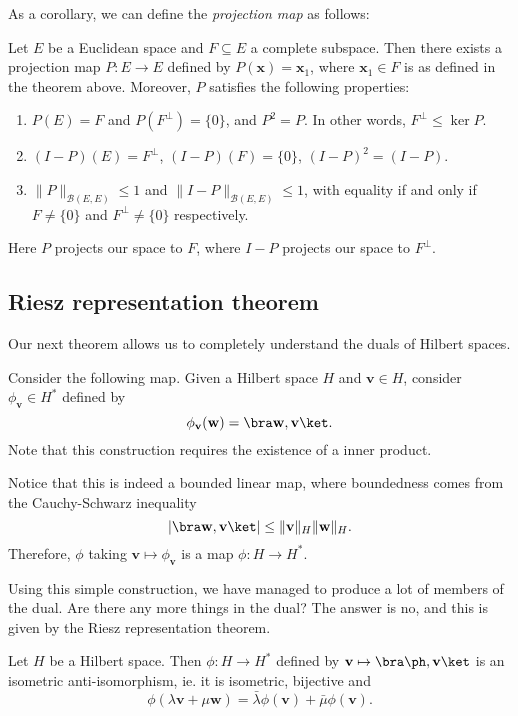 \documentclass[a4paper]{article}
\begin{document}
As a corollary, we can define the \emph{projection map} as follows:
\begin{cor}
  Let $E$ be a Euclidean space and $F\subseteq E$ a complete subspace. Then there exists a projection map $P: E \to E$ defined by $P(\mathbf{x}) = \mathbf{x}_1$, where $\mathbf{x}_1 \in F$ is as defined in the theorem above. Moreover, $P$ satisfies the following properties:
  \begin{enumerate}
    \item $P(E) = F$ and $P(F^\perp) = \{0\}$, and $P^2 = P$. In other words, $F^\perp \leq \ker P$.
    \item $(I - P)(E) = F^{\perp}$, $(I - P)(F) = \{0\}$, $(I - P)^2 = (I - P)$.
    \item $\|P\|_{\mathcal{B}(E, E)} \leq 1$ and $\|I - P\|_{\mathcal{B}(E, E)} \leq 1$, with equality if and only if $F \not= \{0\}$ and $F^{\perp} \not= \{0\}$ respectively.
  \end{enumerate}
\end{cor}
Here $P$ projects our space to $F$, where $I - P$ projects our space to $F^\perp$.

\subsection{Riesz representation theorem}
Our next theorem allows us to completely understand the duals of Hilbert spaces.

Consider the following map. Given a Hilbert space $H$ and $\mathbf{v} \in H$, consider $\phi_{\mathbf{v}} \in H^*$ defined by
\[
  \phi_{\mathbf{v}}(\mathbf{w}) = \bra \mathbf{w}, \mathbf{v}\ket.
\]
Note that this construction requires the existence of a inner product.

Notice that this is indeed a bounded linear map, where boundedness comes from the Cauchy-Schwarz inequality
\[
  |\bra \mathbf{w}, \mathbf{v}\ket| \leq \|\mathbf{v}\|_H \|\mathbf{w}\|_H.
\]
Therefore, $\phi$ taking $\mathbf{v} \mapsto \phi_{\mathbf{v}}$ is a map $\phi: H \to H^*$.

Using this simple construction, we have managed to produce a lot of members of the dual. Are there any more things in the dual? The answer is no, and this is given by the Riesz representation theorem.
\begin{prop}
  Let $H$ be a Hilbert space. Then $\phi: H\to H^*$ defined by $\mathbf{v} \mapsto \bra \ph, \mathbf{v}\ket$ is an isometric anti-isomorphism, ie. it is isometric, bijective and
  \[
    \phi(\lambda \mathbf{v} + \mu \mathbf{w}) = \bar{\lambda} \phi(\mathbf{v}) + \bar{\mu} \phi(\mathbf{v}).
  \]
\end{prop}
\end{document}
